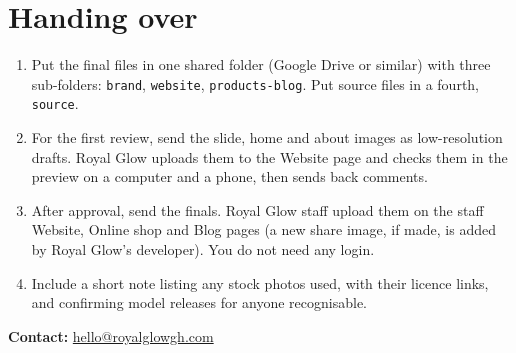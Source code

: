 \documentclass[11pt,a4paper]{article}
\newcommand{\key}[1]{{\footnotesize\texttt{#1}}}
\begin{document}
\section{Handing over}
\begin{enumerate}
  \item Put the final files in one shared folder (Google Drive or similar) with three sub-folders: \key{brand}, \key{website}, \key{products-blog}. Put source files in a fourth, \key{source}.
  \item For the first review, send the slide, home and about images as low-resolution drafts. Royal Glow uploads them to the Website page and checks them in the preview on a computer and a phone, then sends back comments.
  \item After approval, send the finals. Royal Glow staff upload them on the staff Website, Online shop and Blog pages (a new share image, if made, is added by Royal Glow's developer). You do not need any login.
  \item Include a short note listing any stock photos used, with their licence links, and confirming model releases for anyone recognisable.
\end{enumerate}

\textbf{Contact:} \href{mailto:hello@royalglowgh.com}{hello@royalglowgh.com}
\end{document}
